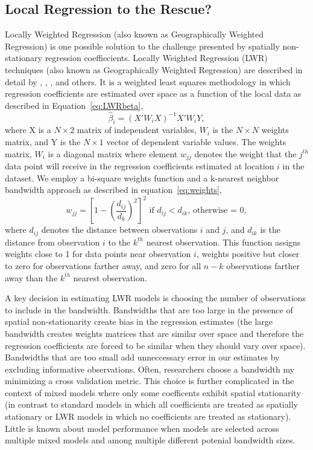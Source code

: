 \documentclass{article}\usepackage[]{graphicx}\usepackage[]{color}
\begin{document}
\subsection{Local Regression to the Rescue?}
Locally Weighted Regression (also known as Geographically Weighted Regression) is one possible solution to the challenge presented by spatially non-stationary regression coeffiecients. Locally Weighted Regression (LWR) techniques (also known as Geographically Weighted Regression) are described in detail by \citet{Cleveland1988}, \citet{Brunsdon1998b}, \citet{Fotheringham2002}, and others. It is a weighted least squares methodology in which regression coefficients are estimated over space as a function of the local data as described in Equation~\eqref{eq:LWRbeta},
\begin{equation}\label{eq:LWRbeta}
\hat{\beta}_i = (X'W_iX)^{-1}X'W_iY,
\end{equation}
where X is a $N \times 2$ matrix of independent variables, $W_i$ is the $N \times N$ weights matrix, and Y is the $N \times 1$ vector of dependent variable values. The weights matrix, $W_i$ is a diagonal matrix where element $w_{jj}$ denotes the weight that the $j^{th}$ data point will receive in the regression coefficients estimated at location $i$ in the dataset. We employ a bi-square weights function and a k-nearest neighbor bandwidth approach as described in equation~\eqref{eq:weights}, 
\begin{equation}\label{eq:weights}
w_{jj}=\left[1-\left(\frac{d_{ij}}{d_{k}}\right)^2 \right]^2 \textrm{ if  }d_{ij}<d_{ik}\textrm{, otherwise = 0},
\end{equation}
where $d_{ij}$ denotes the distance between observations $i$ and $j$, and $d_{ik}$ is the distance from observation $i$ to the $k^{th}$ nearest observation. This function assigns weights close to 1 for data points near observation $i$, weights positive but closer to zero for observations farther away, and zero for all $n-k$ observations farther away than the $k^{th}$ nearest observation. 

A key decision in estimating LWR models is choosing the number of observations to include in the bandwidth. Bandwidths that are too large in the presence of spatial non-stationarity create bias in the regression estimates (the large bandwidth creates weights matrices that are similar over space and therefore the regression coefficients are forced to be similar when they should vary over space). Bandwidths that are too small add unneccessary error in our estimates by excluding informative observations. Often, researchers choose a bandwidth my minimizing a cross validation metric. This choice is further complicated in the context of mixed models where only some coefficents exhibit spatial stationarity (in contrast to standard models in which all coefficients are treated as spatially stationary or LWR models in which no coefficients are treated as stationary). Little is known about model performance when models are selected across multiple mixed models and among multiple different potenial bandwidth sizes.
\end{document}
